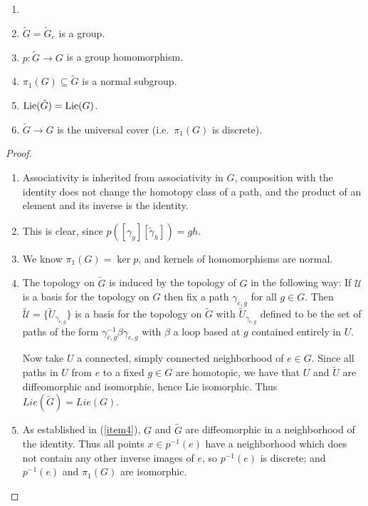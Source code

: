  \begin{claim}
   \begin{enumerate}\item[]
   \item $\tilde G = \tilde G_e$ is a group.
   \item $p:\tilde G\to G$ is a group homomorphism.
   \item $\pi_1(G)\subseteq \tilde G$ is a normal subgroup.
   \item $\operatorname{Lie}(\tilde G)=\operatorname{Lie}(G)$.
   \item $\tilde G\to G$ is the universal cover (i.e.\ $\pi_1(G)$ is discrete).
   \end{enumerate}
 \end{claim}
\begin{proof}
 \begin{enumerate}
 \item Associativity is inherited from associativity in $G$, composition with the identity does not change the homotopy class of a path, and the product of an element and its inverse is the identity.
 \item This is clear, since $p([\gamma_g][\tilde\gamma_h])=gh$.
 \item We know $\pi_1(G)=\ker p$, and kernels of homomorphisms are normal.
 \item \label{item4} The topology on $\tilde G$ is induced by the topology
 of $G$ in the following way:  If $\mathcal{U}$ is a basis for the topology on $G$ then
 fix a path $\gamma_{e,g}$ for all $g\in G$.  Then $\tilde{\mathcal{U}} = \{ \tilde U_{\gamma_{e,g}} \} $
 is a basis for the topology on $\tilde G$ with $\tilde U_{\gamma_{e,g}} $ defined to be the set of
 paths of the form $\gamma_{e,g}^{-1} \beta \gamma_{e,g}$ with $\beta$ a loop based at $g$
 contained entirely in $U$.

 Now take $U$ a connected, simply connected neighborhood of $e \in G$.  Since all
 paths in $U$ from $e$ to a fixed $g\in G$ are homotopic, we have that $U$ and $\tilde
 U$ are diffeomorphic and isomorphic, hence Lie isomorphic.  Thus $Lie(\tilde
 G)=Lie(G)$.

 \item As established in (\ref{item4}), $G$ and $\tilde G$ are diffeomorphic
 in a neighborhood of the identity.  Thus all points $x \in p^{-1}(e)$ have a
 neighborhood which does not contain any other inverse images of $e$, so $p^{-1}(e)$
 is discrete; and $p^{-1}(e)$ and $\pi_1(G)$ are isomorphic.
 \end{enumerate}
 \end{proof}

